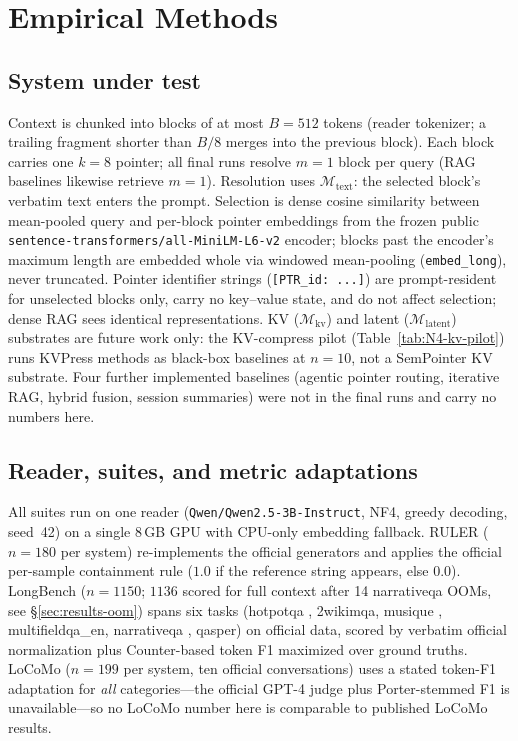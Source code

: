 \documentclass[conference]{IEEEtran}
\begin{document}
{\section{Empirical Methods}\label{sec:experiments}\label{sec:methods}
\subsection{System under test}\label{sec:methods-selection}
Context is chunked into blocks of at most $B=512$ tokens (reader tokenizer;
a trailing fragment shorter than $B/8$ merges into the previous block). Each block
carries one $k=8$ pointer; all final runs resolve $m=1$ block per query
(RAG baselines likewise retrieve $m=1$). Resolution uses $\mathcal{M}_{\mathrm{text}}$:
the selected block's verbatim text enters the prompt. Selection is dense cosine
similarity between mean-pooled query and per-block pointer embeddings from the
frozen public \texttt{sentence-transformers/all-MiniLM-L6-v2} encoder; blocks past
the encoder's maximum length are embedded whole via windowed mean-pooling
(\texttt{embed\_long}), never truncated. Pointer identifier strings
(\texttt{[PTR\_id: ...]}) are prompt-resident for unselected blocks only, carry
no key--value state, and do not affect selection; dense RAG sees identical
representations. KV ($\mathcal{M}_{\mathrm{kv}}$) and latent
($\mathcal{M}_{\mathrm{latent}}$) substrates are future work only\label{sec:methods-scope}: the KV-compress
pilot (Table~\ref{tab:N4-kv-pilot}) runs KVPress methods as black-box baselines at
$n=10$, not a SemPointer KV substrate. Four further implemented baselines (agentic
pointer routing, iterative RAG, hybrid fusion, session summaries) were not in the
final runs and carry no numbers here.
\subsection{Reader, suites, and metric adaptations}
All suites run on one reader (\texttt{Qwen/Qwen2.5-3B-Instruct}, NF4, greedy
decoding, seed~42) on a single 8\,GB GPU with CPU-only embedding fallback.
RULER ($n=180$ per system) re-implements the official generators and applies the
official per-sample containment rule ($1.0$ if the reference string appears, else
$0.0$). LongBench ($n=1150$; $1136$ scored for full context after 14 narrativeqa
OOMs, see \S\ref{sec:results-oom}) spans six tasks (hotpotqa \cite{yang2018hotpotqa}, 2wikimqa, musique \cite{trivedi2022musique},
multifieldqa\_en, narrativeqa \cite{kovcisky2018narrativeqa}, qasper) on official data, scored by verbatim
official normalization plus Counter-based token F1 maximized over ground truths.
LoCoMo ($n=199$ per system, ten official conversations) uses a stated token-F1
adaptation for \textit{all} categories---the official GPT-4 judge plus
Porter-stemmed F1 is unavailable---so no LoCoMo number here is comparable to
published LoCoMo results.
}
\end{document}

